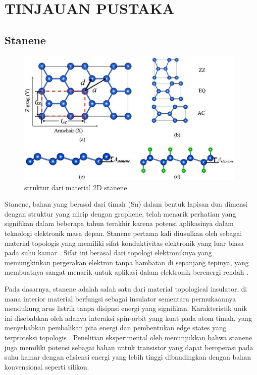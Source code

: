 \renewcommand{\thechapter}{\Roman{chapter}}
\chapter{TINJAUAN PUSTAKA}
\renewcommand{\thechapter}{\arabic{chapter}}
\section{Stanene}
\begin{figure}
    \centering
    \includegraphics[width=17cm]{./gambar/struktur stanene.jpg}
    \caption{struktur dari material 2D stanene \citep{lu2017}}
    \label{struktur stanene}
\end{figure}
Stanene, bahan yang berasal dari timah (Sn) dalam bentuk lapisan dua dimensi dengan struktur yang mirip dengan graphene, telah menarik perhatian yang signifikan dalam beberapa tahun terakhir karena potensi aplikasinya dalam teknologi elektronik masa depan. Stanene pertama kali diusulkan oleh \citep{He2019} sebagai material topologis yang memiliki sifat konduktivitas elektronik yang luar biasa pada suhu kamar . Sifat ini berasal dari topologi elektroniknya yang memungkinkan pergerakan elektron tanpa hambatan di sepanjang tepinya, yang membuatnya sangat menarik untuk aplikasi dalam elektronik berenergi rendah .

Pada dasarnya, stanene adalah salah satu dari material topological insulator, di mana interior material berfungsi sebagai insulator sementara permukaannya mendukung arus listrik tanpa disipasi energi yang signifikan. Karakteristik unik ini disebabkan oleh adanya interaksi spin-orbit yang kuat pada atom timah, yang menyebabkan pembalikan pita energi dan pembentukan edge states yang terproteksi topologis . Penelitian eksperimental oleh \citep{zhu2015} menunjukkan bahwa stanene juga memiliki potensi sebagai bahan untuk transistor yang dapat beroperasi pada suhu kamar dengan efisiensi energi yang lebih tinggi dibandingkan dengan bahan konvensional seperti silikon.

